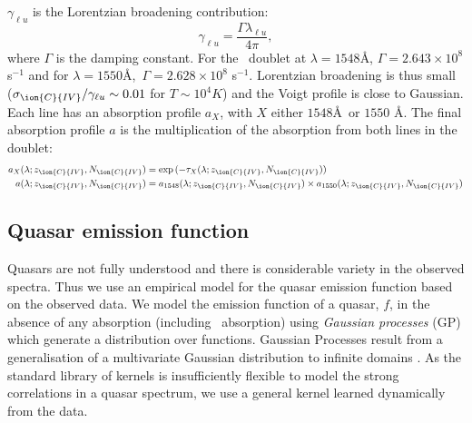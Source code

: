 \documentclass[fleqn,usenatbib]{mnras}
\newcommand{\civ}{\ion{C}{IV}}
\newcommand{\nciv}{N_{\civ}} %
\newcommand{\zciv}{z_{\civ}}
\newcommand{\sciv}{\sigma_{\civ}}
\newcommand{\mfho}[1]{\textcolor{flatirons}{[\bf MFH: #1]}}
\begin{document}
    $\gamma_{\ell u}$  is the Lorentzian broadening contribution:
  \begin{equation}
    \gamma_{\ell u} = \frac{\Gamma \lambda_{\ell u}}{4\pi},
  \end{equation}
  where $\Gamma$ is the damping constant.
  For the \civ\ doublet at
  $\lambda=1548$\AA, $\Gamma =  2.643\times 10^8$ s$^{-1}$ and
  for $\lambda=1550$\AA,\ $\Gamma = 2.628\times 10^8$ s$^{-1}$.
  Lorentzian broadening is thus small
  ($\sciv/\gamma_{\ell u}\sim 0.01$ for $T\sim10^4K$) and the Voigt profile is close to Gaussian. Each line has an absorption profile $a_X$, with $X$ either $1548$\AA~or $1550$ \AA. The final absorption profile $a$ is the multiplication of the absorption from both lines in the doublet:
  \begin{align}
    \label{eq:a}
    a_X(\lambda; \zciv, \nciv) &=
 \exp{(-\tau_{X}(\lambda; \zciv, \nciv))} \\
    a(\lambda; \zciv, \nciv) &= a_{1548}(\lambda; \zciv, \nciv) \times a_{1550}(\lambda; \zciv, \nciv)
   \end{align}

\subsection{Quasar emission function}
\label{sec:null_model}

Quasars are not fully understood and there is considerable variety in the observed spectra. Thus we use an empirical model for the quasar emission function based on the observed data. We  model the emission function of a quasar,  $f$, in the absence of any
absorption (including
\civ\ absorption) using \emph{Gaussian processes} (GP) which  generate a
distribution over functions. Gaussian Processes result from a
generalisation of a multivariate Gaussian distribution to
infinite domains \citep{GPbook}.
As the standard library of kernels is insufficiently flexible
to model the strong correlations in a quasar spectrum, we use a
general kernel learned dynamically from the data.
\end{document}
